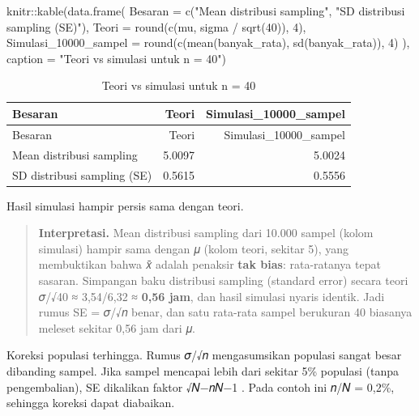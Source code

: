 \documentclass[
  indonesian,
  letterpaper,
]{book}
\newenvironment{Shaded}{\begin{snugshade}}{\end{snugshade}}
\newcommand{\AttributeTok}[1]{\textcolor[rgb]{0.40,0.45,0.13}{#1}}
\newcommand{\DecValTok}[1]{\textcolor[rgb]{0.68,0.00,0.00}{#1}}
\newcommand{\FunctionTok}[1]{\textcolor[rgb]{0.28,0.35,0.67}{#1}}
\newcommand{\NormalTok}[1]{\textcolor[rgb]{0.00,0.23,0.31}{#1}}
\newcommand{\SpecialCharTok}[1]{\textcolor[rgb]{0.37,0.37,0.37}{#1}}
\newcommand{\StringTok}[1]{\textcolor[rgb]{0.13,0.47,0.30}{#1}}
\begin{document}
\begin{Shaded}
\begin{Highlighting}[]
\NormalTok{knitr}\SpecialCharTok{::}\FunctionTok{kable}\NormalTok{(}\FunctionTok{data.frame}\NormalTok{(}
\AttributeTok{Besaran =} \FunctionTok{c}\NormalTok{(}\StringTok{"Mean distribusi sampling"}\NormalTok{, }\StringTok{"SD distribusi sampling (SE)"}\NormalTok{),}
\AttributeTok{Teori =} \FunctionTok{round}\NormalTok{(}\FunctionTok{c}\NormalTok{(mu, sigma }\SpecialCharTok{/} \FunctionTok{sqrt}\NormalTok{(}\DecValTok{40}\NormalTok{)), }\DecValTok{4}\NormalTok{),}
\AttributeTok{Simulasi\_10000\_sampel =} \FunctionTok{round}\NormalTok{(}\FunctionTok{c}\NormalTok{(}\FunctionTok{mean}\NormalTok{(banyak\_rata), }\FunctionTok{sd}\NormalTok{(banyak\_rata)), }\DecValTok{4}\NormalTok{)}
\NormalTok{), }\AttributeTok{caption =} \StringTok{"Teori vs simulasi untuk n = 40"}\NormalTok{)}
\end{Highlighting}
\end{Shaded}

\begin{longtable}[]{@{}lrr@{}}
\caption{Teori vs simulasi untuk n = 40}\tabularnewline
\toprule\noalign{}
Besaran & Teori & Simulasi\_10000\_sampel \\
\midrule\noalign{}
\endfirsthead
\toprule\noalign{}
Besaran & Teori & Simulasi\_10000\_sampel \\
\midrule\noalign{}
\endhead
\bottomrule\noalign{}
\endlastfoot
Mean distribusi sampling & 5.0097 & 5.0024 \\
SD distribusi sampling (SE) & 0.5615 & 0.5556 \\
\end{longtable}

Hasil simulasi hampir persis sama dengan teori.

\begin{quote}
\textbf{Interpretasi.} Mean distribusi sampling dari 10.000 sampel
(kolom simulasi) hampir sama dengan 𝜇 (kolom teori, sekitar 5), yang
membuktikan bahwa 𝑥̄ adalah penaksir \textbf{tak bias}: rata-ratanya
tepat sasaran. Simpangan baku distribusi sampling (standard error)
secara teori 𝜎/√40 ≈ 3,54/6,32 ≈ \textbf{0,56 jam}, dan hasil simulasi
nyaris identik. Jadi rumus SE = 𝜎/√𝑛 benar, dan satu rata-rata sampel
berukuran 40 biasanya meleset sekitar 0,56 jam dari 𝜇.
\end{quote}

Koreksi populasi terhingga. Rumus 𝜎/√𝑛 mengasumsikan populasi sangat
besar dibanding sampel. Jika sampel mencapai lebih dari sekitar 5\%
populasi (tanpa pengembalian), SE dikalikan faktor √𝑁−𝑛𝑁−1 . Pada contoh
ini 𝑛/𝑁 = 0,2\%, sehingga koreksi dapat diabaikan.
\end{document}
